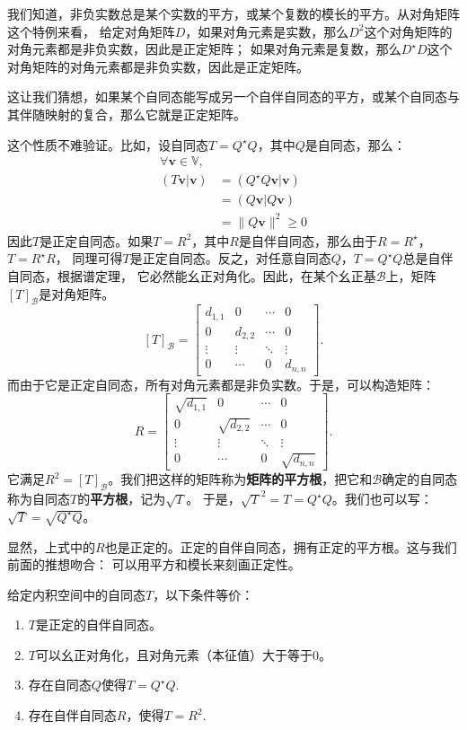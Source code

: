\documentclass[12pt,UTF8]{ctexbook}
\begin{document}
我们知道，非负实数总是某个实数的平方，或某个复数的模长的平方。从对角矩阵这个特例来看，
给定对角矩阵$D$，如果对角元素是实数，那么$D^2$这个对角矩阵的对角元素都是非负实数，因此是正定矩阵；
如果对角元素是复数，那么$D^\star D$这个对角矩阵的对角元素都是非负实数，因此是正定矩阵。

这让我们猜想，如果某个自同态能写成另一个自伴自同态的平方，或某个自同态与其伴随映射的复合，那么它就是正定矩阵。

这个性质不难验证。比如，设自同态$T = Q^\star Q$，其中$Q$是自同态，那么：
\begin{align*}
    \forall \mathbf{v} \in \mathbb{V},  \\
    (T\mathbf{v} | \mathbf{v}) &= (Q^\star Q\mathbf{v} | \mathbf{v})  \\
    &= (Q\mathbf{v} | Q\mathbf{v})  \\
    &= \| Q\mathbf{v} \|^2 \geqslant 0 
\end{align*}
因此$T$是正定自同态。如果$T = R^2$，其中$R$是自伴自同态，那么由于$R = R^\star$，$T = R^\star R$，
同理可得$T$是正定自同态。反之，对任意自同态$Q$，$T = Q^\star Q$总是自伴自同态，根据谱定理，
它必然能幺正对角化。因此，在某个幺正基$\mathcal{B}$上，矩阵$[T]_\mathcal{B}$是对角矩阵。
$$ [T]_\mathcal{B} = \begin{bmatrix}
    d_{1,1} & 0 & \cdots & 0 \\
    0 & d_{2,2} & \cdots & 0 \\
    \vdots & \vdots & \ddots & \vdots \\
    0 & \cdots & 0 & d_{n,n}
\end{bmatrix}.$$
而由于它是正定自同态，所有对角元素都是非负实数。于是，可以构造矩阵：
$$ R = \begin{bmatrix}
    \sqrt{d_{1,1}} & 0 & \cdots & 0 \\
    0 & \sqrt{d_{2,2}} & \cdots & 0 \\
    \vdots & \vdots & \ddots & \vdots \\
    0 & \cdots & 0 & \sqrt{d_{n,n}}
\end{bmatrix}.$$
它满足$R^2 = [T]_\mathcal{B}$。我们把这样的矩阵称为\textbf{矩阵的平方根}，把它和$\mathcal{B}$确定的自同态称为自同态$T$的\textbf{平方根}，记为$\sqrt{T}$。
于是，$\sqrt{T}^2 = T = Q^\star Q$。我们也可以写：$\sqrt{T} = \sqrt{Q^\star Q}$。

显然，上式中的$R$也是正定的。正定的自伴自同态，拥有正定的平方根。这与我们前面的推想吻合：
可以用平方和模长来刻画正定性。
\begin{pp}\label{pp:8_12}
    给定内积空间中的自同态$T$，以下条件等价：
    \begin{enumerate}
        \item $T$是正定的自伴自同态。
        \item $T$可以幺正对角化，且对角元素（本征值）大于等于$0$。
        \item 存在自同态$Q$使得$T = Q^\star Q.$
        \item 存在自伴自同态$R$，使得$T =R^2.$
    \end{enumerate}
\end{pp}
\end{document}
